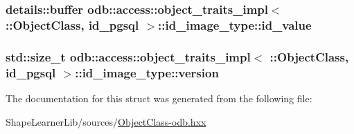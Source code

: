 \subsubsection[{id\+\_\+value}]{\setlength{\rightskip}{0pt plus 5cm}details\+::buffer odb\+::access\+::object\+\_\+traits\+\_\+impl$<$ \+::{\bf Object\+Class}, id\+\_\+pgsql $>$\+::id\+\_\+image\+\_\+type\+::id\+\_\+value}\label{structodb_1_1access_1_1object__traits__impl_3_01_1_1_object_class_00_01id__pgsql_01_4_1_1id__image__type_a1014e43a9bb0d398885baefca406c617}
\hypertarget{structodb_1_1access_1_1object__traits__impl_3_01_1_1_object_class_00_01id__pgsql_01_4_1_1id__image__type_ab6758ede2ed23642f74eff59658f5eeb}{}
\subsubsection[{version}]{\setlength{\rightskip}{0pt plus 5cm}std\+::size\+\_\+t odb\+::access\+::object\+\_\+traits\+\_\+impl$<$ \+::{\bf Object\+Class}, id\+\_\+pgsql $>$\+::id\+\_\+image\+\_\+type\+::version}\label{structodb_1_1access_1_1object__traits__impl_3_01_1_1_object_class_00_01id__pgsql_01_4_1_1id__image__type_ab6758ede2ed23642f74eff59658f5eeb}


The documentation for this struct was generated from the following file\+:\begin{DoxyCompactItemize}
\item 
Shape\+Learner\+Lib/sources/\hyperlink{_object_class-odb_8hxx}{Object\+Class-\/odb.\+hxx}\end{DoxyCompactItemize}
